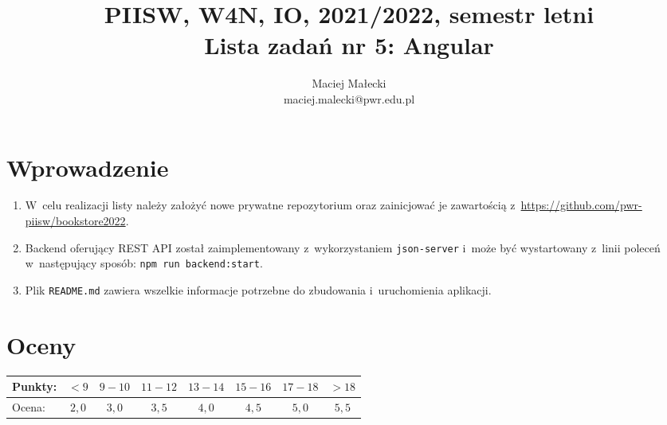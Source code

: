 \documentclass[12pt]{article}
\title{PIISW, W4N, IO, 2021/2022, semestr letni\\Lista zadań nr 5: Angular}
\author{Maciej Małecki\\ \small maciej.malecki@pwr.edu.pl}
\begin{document}
    \maketitle

    \section*{Wprowadzenie}
        \begin{enumerate}
            \item W~celu realizacji listy należy założyć nowe prywatne repozytorium oraz zainicjować je zawartością z~\href{https://github.com/pwr-piisw/bookstore2022}{https://github.com/pwr-piisw/bookstore2022}.
            \item Backend oferujący REST API został zaimplementowany z~wykorzystaniem \texttt{json-server} i~może być wystartowany z~linii poleceń w~następujący sposób: \texttt{npm run backend:start}.
			\item Plik \texttt{README.md} zawiera wszelkie informacje potrzebne do zbudowania i~uruchomienia aplikacji.
        \end{enumerate}

    \section*{Oceny}
    \begin{tabular}{|l|c|c|c|c|c|c|c|}
        \hline
        Punkty: & $<9$ & $9-10$ & $11-12$ & $13-14$ & $15-16$ & $17-18$ & $>18$\\
        \hline
        Ocena:  & $2,0$ & $3,0$ & $3,5$ & $4,0$ & $4,5$ & $5,0$ & $5,5$\\
        \hline
    \end{tabular}
\end{document}
